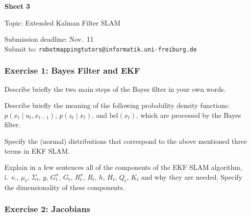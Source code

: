 \documentclass[12pt,a4paper]{article}
\begin{document}


\begin{center}
{\bf \Large Sheet 3}

{\large Topic: Extended Kalman Filter SLAM}

Submission deadline: Nov.~11\\
Submit to: \texttt{robotmappingtutors@informatik.uni-freiburg.de}
\end{center}

\subsubsection*{Exercise 1: Bayes Filter and EKF}

\begin{enumialpha}
\item Describe briefly the two main steps of the Bayes filter in your own words.

\item Describe briefly the meaning of the following probability density functions: $p(x_t \mid u_t, x_{t-1})$, $p(z_t \mid x_t)$, and $\text{bel}(x_t)$, which are processed by the Bayes filter. 

\item Specify the (normal) distributions that correspond to the above mentioned three terms in EKF SLAM.

\item Explain in a few sentences all of the components of the EKF SLAM algorithm, \mbox{i.\ e.}, $\mu_t$, $\Sigma_t$, $g$, $G^x_t$, $G_t$, $R^x_t$, $R_t$, $h$, $H_t$, $Q_t$, $K_t$ and why they are needed. Specify the dimensionality of these components.
\end{enumialpha}

\subsubsection*{Exercise 2: Jacobians}
\end{document}
